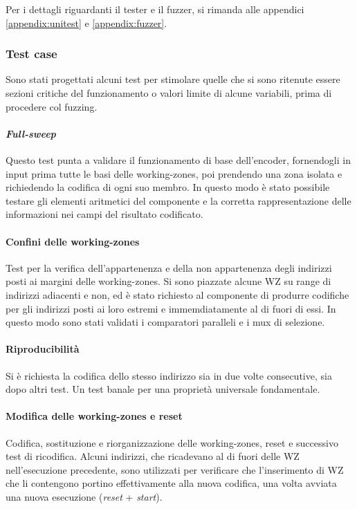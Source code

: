 \documentclass[11pt,a4paper]{article}
\begin{document}
Per i dettagli riguardanti il tester e il fuzzer, si rimanda alle appendici \ref{appendix:unitest} e \ref{appendix:fuzzer}.

\subsubsection{Test case}
Sono stati progettati alcuni test per stimolare quelle che si sono ritenute essere sezioni critiche del funzionamento o valori limite di alcune variabili,
prima di procedere col fuzzing.

\paragraph{\emph{Full-sweep}}
Questo test punta a validare il funzionamento di base dell'encoder, fornendogli in input prima tutte le basi delle working-zones, poi prendendo una zona
isolata e richiedendo la codifica di ogni suo membro. In questo modo è stato possibile testare gli elementi aritmetici del componente e la corretta
rappresentazione delle informazioni nei campi del risultato codificato.

\paragraph{Confini delle working-zones}
Test per la verifica dell'appartenenza e della non appartenenza degli indirizzi posti ai margini delle working-zones. Si sono piazzate alcune WZ su range
di indirizzi adiacenti e non, ed è stato richiesto al componente di produrre codifiche per gli indirizzi posti ai loro estremi e immemdiatamente al di
fuori di essi. In questo modo sono stati validati i comparatori paralleli e i mux di selezione.

\paragraph{Riproducibilità}
Si è richiesta la codifica dello stesso indirizzo sia in due volte consecutive, sia dopo altri test. Un test banale per una proprietà universale
fondamentale.

\paragraph{Modifica delle working-zones e reset}
Codifica, sostituzione e riorganizzazione delle working-zones, reset e successivo test di ricodifica. Alcuni indirizzi, che ricadevano al di fuori delle WZ
nell'esecuzione precedente, sono utilizzati per verificare che l'inserimento di WZ che li contengono portino effettivamente alla nuova codifica, una volta
avviata una nuova esecuzione (\emph{reset} + \emph{start}).
\end{document}
